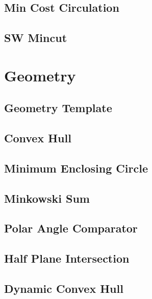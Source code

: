 \documentclass{article}
\begin{document}
\subsection{Min Cost Circulation}


\subsection{SW Mincut}


\section{Geometry}

\subsection{Geometry Template}


\subsection{Convex Hull}


\subsection{Minimum Enclosing Circle}


\subsection{Minkowski Sum}


\subsection{Polar Angle Comparator}


\subsection{Half Plane Intersection}


\subsection{Dynamic Convex Hull}

\end{document}
